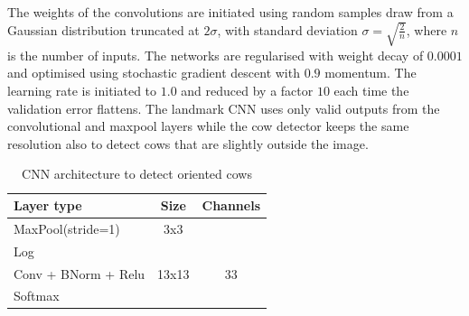 \documentclass{IET}
\begin{document}
The weights of the convolutions are initiated using random samples draw from a Gaussian
distribution truncated at $2\sigma$, with standard deviation $\sigma=\sqrt{\frac{2}{n}}$,
where $n$ is the number of inputs\cite{DBLP:journals/corr/HeZR015}. The networks are regularised with weight decay of
$0.0001$ and optimised using stochastic gradient descent with $0.9$ momentum. The
learning rate is initiated to $1.0$ and reduced by a factor $10$ each time the validation
error flattens. The landmark CNN uses only valid outputs from the convolutional and maxpool
layers while the cow detector keeps the same resolution also to detect cows that are
slightly outside the image.

\begin{table}
\begin{center}
\begin{tabular}{|l|c|c|}
\hline
\textbf{Layer type} & \textbf{Size} & \textbf{Channels} \\
\hline

MaxPool(stride=1) & 3x3 &  \\
Log & & \\
Conv + BNorm + Relu & 13x13 & 33 \\
Softmax & & \\
\hline
\end{tabular}
\end{center}
\caption{CNN architecture to detect oriented cows
}
\label{tab:cowdirnet}
\end{table}
\end{document}
